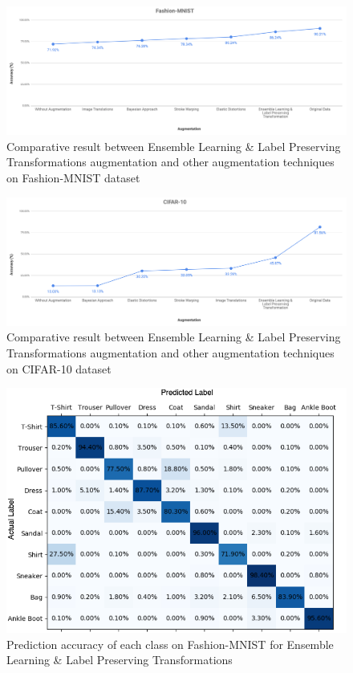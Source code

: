\begin{figure}
  \centering
  \label{fig:Fashion_MNIST_ensamble_result}
  \includegraphics[width=1\textwidth]{fig/contribution/fashion-mnist-ensamble-result}
  \caption{Comparative result between Ensemble Learning \& Label Preserving Transformations augmentation and other augmentation techniques on Fashion-MNIST dataset}
\end{figure}


\begin{figure}
  \centering
  \label{fig:Cifar_10_ensamble_result}
  \includegraphics[width=1\textwidth]{fig/contribution/cifar-10-ensamble-result}
  \caption{Comparative result between Ensemble Learning \& Label Preserving Transformations augmentation and other augmentation techniques on CIFAR-10 dataset}
\end{figure}

\begin{figure}
  \centering
  \label{fig:Fashion_MNIST_Ensamble_Heatmaps}
  \includegraphics[width=1\textwidth]{fig/contribution/Fashion_MNIST_Ensamble}
  \caption{Prediction accuracy of each class on Fashion-MNIST for Ensemble Learning \& Label Preserving Transformations}
\end{figure}

